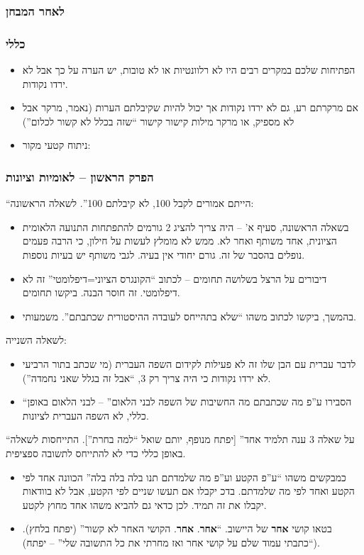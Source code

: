 \documentclass[a4paper]{book}
\begin{document}
	\subsubsection{לאחר המבחן}
	\subsubsection*{כללי}
	\begin{itemize}
		\item הפתיחות שלכם במקרים רבים היו לא רלוונטיות או לא טובות, יש הערה על כך אבל לא ירדו נקודות. 
		\item אם מרקרתם רע, גם לא ירדו נקודות אך יכול להיות שקיבלתם הערות (נאמר, מרקר אבל לא מספיק, או מרקר מילות קישור קישור ``שזה בכלל לא קשור לכלום'')
		\item ניתוח קטעי מקור: 
	\end{itemize}
	\subsubsection*{הפרק הראשון – לאומיות וציונות}
	``הייתם אמורים לקבל 100, לא קיבלתם 100''. לשאלה הראשונה: 
	\begin{itemize}
		\item בשאלה הראשונה, סעיף א' – היה צריך להציג 2 גורמים להתפתחות התנועה הלאומית הציונית, אחד משותף ואחר לא. ממש לא מומלץ לעשות על חילון, כי הרבה פעמים נופלים בהסבר של זה. גורם יחודי אין בעיה. לגבי משותף יש בעיות נוספות. 
		\item דיבורים על הרצל בשלושה תחומים – לכתוב ``הקונגרס הציוני=דיפלומטי'' זה לא דיפלומטי. זה חוסר הבנה. ביקשו תחומים. 
		\item בהמשך, ביקשו לכתוב משהו ``שלא בתהייחס לעובדה ההיסטורית שכתבתם''. משמעותי. 
	\end{itemize}
	לשאלה השנייה: 
	\begin{itemize}
		\item לדבר עברית עם הבן שלו זה לא פעילות לקידום השפה העברית (מי שכתב בתור הרביעי לא ירדו נקודות כי היה צריך רק 3, ``אבל זה בגלל שאני נחמדה''). 
		\item ``הסבירו ע''פ מה שכתבתם מה החשיבות של השפה לבני הלאום'' – לבני הלאום באופן כללי, לא השפה העברית לציונות. 
	\end{itemize}
	``על שאלה 3 ענה תלמיד אחד'' [יפתח מנופף, יותם שואל ``למה בחרת'']. התייחסות לשאלה באופן כללי כדי לא להתייחס לתשובה ספציפית. 
	\begin{itemize}
		\item כמבקשים משהו ``ע''פ הקטע וע''פ מה שלמדתם תנו בלה בלה בלה'' הכוונה אחד לפי הקטע ואחד לפי מה שלמדתם. בדכ יקבלו אם תעשו שניים לפי הקטע, אבל לא בוודאות יקבלו את זה תמיד. לכן כדאי גם להביא משהו אחד מחוץ לקטע. 
		\item בטאו קושי \textbf{אחר} של היישוב. ``\textbf{אחר}. \textbf{אחר}. הקושי האחר לא קשור'' (יפתח בלחץ). (``כתבתי עמוד שלם על קושי אחר ואז מחרתי את כל התשובה שלי'' – יפתח). 
	\end{itemize}
	
\end{document}
